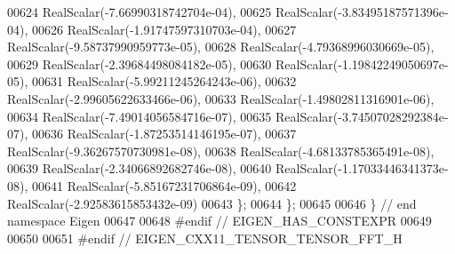 \begin{DoxyCode}
00624     RealScalar(-7.66990318742704e-04),
00625     RealScalar(-3.83495187571396e-04),
00626     RealScalar(-1.91747597310703e-04),
00627     RealScalar(-9.58737990959773e-05),
00628     RealScalar(-4.79368996030669e-05),
00629     RealScalar(-2.39684498084182e-05),
00630     RealScalar(-1.19842249050697e-05),
00631     RealScalar(-5.99211245264243e-06),
00632     RealScalar(-2.99605622633466e-06),
00633     RealScalar(-1.49802811316901e-06),
00634     RealScalar(-7.49014056584716e-07),
00635     RealScalar(-3.74507028292384e-07),
00636     RealScalar(-1.87253514146195e-07),
00637     RealScalar(-9.36267570730981e-08),
00638     RealScalar(-4.68133785365491e-08),
00639     RealScalar(-2.34066892682746e-08),
00640     RealScalar(-1.17033446341373e-08),
00641     RealScalar(-5.85167231706864e-09),
00642     RealScalar(-2.92583615853432e-09)
00643   \};
00644 \};
00645 
00646 \}  \textcolor{comment}{// end namespace Eigen}
00647 
00648 \textcolor{preprocessor}{#endif  // EIGEN\_HAS\_CONSTEXPR}
00649 
00650 
00651 \textcolor{preprocessor}{#endif  // EIGEN\_CXX11\_TENSOR\_TENSOR\_FFT\_H}
\end{DoxyCode}
